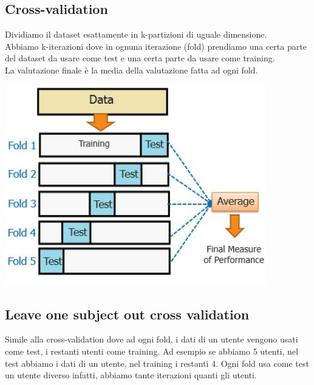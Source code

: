 \subsection{Cross-validation}
\begin{minipage}{.4\textwidth}
   Dividiamo il dataset esattamente in k-partizioni di uguale dimensione. \\Abbiamo k-iterazioni dove in ognuna iterazione (fold) prendiamo una certa parte del dataset da usare come test e una certa parte da usare come training. \\La valutazione finale è la media della valutazione fatta ad ogni fold. 
\end{minipage} 
\hfill
\begin{minipage}{.6\textwidth}
    \begin{center}
        \includegraphics[width=.8\textwidth]{images/MobiDEV/6. activity recognition/cross validation.PNG}
    \end{center}
\end{minipage}

\subsection{Leave one subject out cross validation}
Simile alla cross-validation dove ad ogni fold, i dati di un utente vengono usati come test, i restanti utenti come training. Ad esempio se abbiamo 5 utenti, nel test abbiamo i dati di un utente, nel training i restanti 4.
Ogni fold usa come test un utente diverso infatti, abbiamo tante iterazioni quanti gli utenti.

